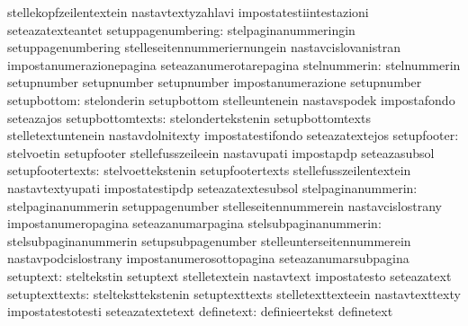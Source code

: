                                   stellekopfzeilentextein          nastavtextyzahlavi
                                  impostatestiintestazioni         seteazatexteantet
              setuppagenumbering: stelpaginanummeringin            setuppagenumbering
                                  stelleseitennummeriernungein     nastavcislovanistran
                                  impostanumerazionepagina         seteazanumerotarepagina
stelnummerin: stelnummerin setupnumber
              setupnumber  setupnumber
              impostanumerazione  setupnumber
                     setupbottom: stelonderin                      setupbottom
                                  stelleuntenein                   nastavspodek
                                  impostafondo                     seteazajos
                setupbottomtexts: stelondertekstenin               setupbottomtexts
                                  stelletextuntenein               nastavdolnitexty
                                  impostatestifondo                seteazatextejos
                     setupfooter: stelvoetin                       setupfooter
                                  stellefusszeileein               nastavupati
                                  impostapdp                       seteazasubsol
                setupfootertexts: stelvoettekstenin                setupfootertexts
                                  stellefusszeilentextein          nastavtextyupati
                                  impostatestipdp                  seteazatextesubsol
              stelpaginanummerin: stelpaginanummerin               setuppagenumber
                                  stelleseitennummerein            nastavcislostrany
                                  impostanumeropagina              seteazanumarpagina
           stelsubpaginanummerin: stelsubpaginanummerin            setupsubpagenumber
                                  stelleunterseitennummerein       nastavpodcislostrany
                                  impostanumerosottopagina         seteazanumarsubpagina
                       setuptext: steltekstin                      setuptext
                                  stelletextein                    nastavtext
                                  impostatesto                     seteazatext
                  setuptexttexts: stelteksttekstenin               setuptexttexts
                                  stelletexttexteein               nastavtexttexty
                                  impostatestotesti                seteazatextetext
                      definetext: definieertekst                   definetext
